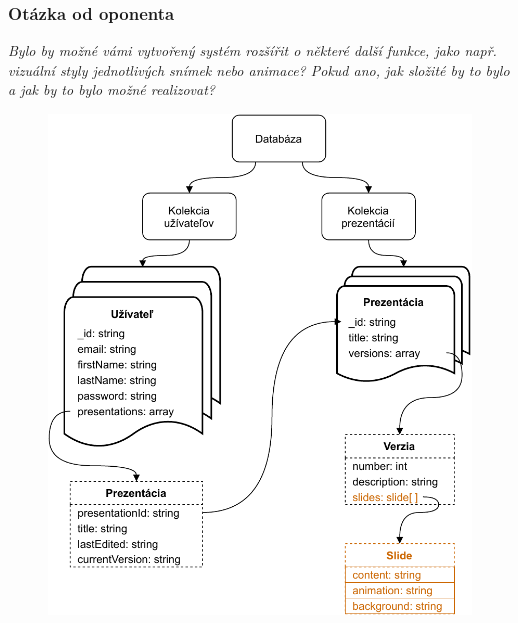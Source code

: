 \documentclass[10pt,xcolor=pdflatex,hyperref={unicode}]{beamer}
\begin{document}

\begin{frame}\frametitle{Otázka od oponenta}
    \emph{    Bylo by možné vámi vytvořený systém rozšířit o některé další funkce, jako např. vizuální styly jednotlivých snímek nebo animace? Pokud ano, jak složité by to bylo a jak by to bylo možné realizovat?}
    
    \begin{figure}[!hbt]
        \centering
        \includegraphics[scale=0.35]{img/databaza-1.pdf}
    \end{figure}
\end{frame}
\end{document}

